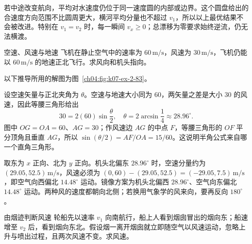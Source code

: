 {\begin{xesolution}
若中途改变航向，平均对水速度仍位于同一速度圆的内部或边界。这个圆盘给出的合速度方向范围不比圆周更大，横河平均分量也不超过 $v_1$，所以以上最优结果不会被改进。特别在 $v_1=v_2$ 时，每一瞬间 $v_x\ge0$；总漂移为零要求始终逆流，仍无法横渡。
\end{xesolution}


\begin{origexamplebox}{空速、风速与地速}\label{ch04:ex:k07-2-83}
飞机在静止空气中的速率为 $60\,\mathrm{m/s}$，风速为 $30\,\mathrm{m/s}$，飞机仍能以 $60\,\mathrm{m/s}$ 的地速正北飞行。求风向和机头指向。

\begin{qualityfigure}
\label{mech:04:83:q}
\end{qualityfigure}
\end{origexamplebox}
\begin{xesolution}
以下推导所用的解图为图~\ref{ch04:fig:k07-ex-2-83}。

设空速矢量与正北夹角为 $\theta$。空速与地速大小同为 $60$，两矢量之差是大小 $30$ 的风速，因此等腰三角形给出
\[
30=2(60)\sin\frac\theta2,
\quad
\boxed{\theta=2\arcsin\frac14\approx28.96^\circ}.
\]
\AircraftEqualSpeedDiagram
图中 $OG=OA=60$、$AG=30$；作风速边 $AG$ 的中点 $F$，等腰三角形的 $OF$ 平分顶角且垂直 $AG$，所以 $\sin(\theta/2)=AF/OA=15/60$。这说明半角公式来自哪一个直角三角形。

取东为 $x$ 正向、北为 $y$ 正向。机头北偏东 $28.96^\circ$ 时，空速分量约为 $(29.05,52.5)\,\mathrm{m/s}$，风速必须为 $(0,60)-(29.05,52.5)=(-29.05,7.5)\,\mathrm{m/s}$，即空气向西偏北 $14.48^\circ$ 运动。镜像方案为机头北偏西 $28.96^\circ$、空气向东偏北 $14.48^\circ$ 运动。两种风的速度都朝向北侧；若换用气象学的风来向，要再反向 $180^\circ$。
\end{xesolution}

\begin{origexamplebox}{由烟迹判断风速}\label{ch04:ex:k07-2-84}
轮船先以速率 $v_1$ 向南航行，船上人看到烟囱冒出的烟向东；船速增至 $v_2$ 后，看到烟向东北。假设烟一离开烟囱就立即随空气以风速运动，忽略上升与喷出过程，且两次风速不变。求风速。


\end{origexamplebox}}

